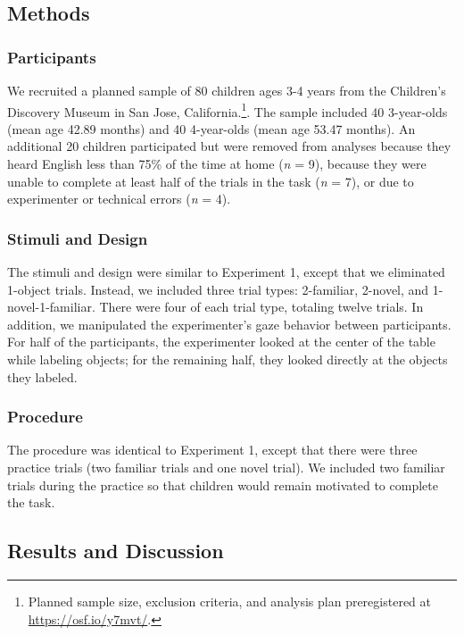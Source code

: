 \documentclass[10pt, letterpaper]{article}
\begin{document}
\subsection{Methods}\label{methods-1}

\subsubsection{Participants}\label{participants-1}

We recruited a planned sample of 80 children ages 3-4 years from the
Children's Discovery Museum in San Jose, California.\footnote{Planned
  sample size, exclusion criteria, and analysis plan preregistered at
  \url{https://osf.io/y7mvt/}.}. The sample included 40 3-year-olds
(mean age 42.89 months) and 40 4-year-olds (mean age 53.47 months). An
additional 20 children participated but were removed from analyses
because they heard English less than 75\% of the time at home (\emph{n}
= 9), because they were unable to complete at least half of the trials
in the task (\emph{n} = 7), or due to experimenter or technical errors
(\emph{n} = 4).

\subsubsection{Stimuli and Design}\label{stimuli-and-design-1}

The stimuli and design were similar to Experiment 1, except that we
eliminated 1-object trials. Instead, we included three trial types:
2-familiar, 2-novel, and 1-novel-1-familiar. There were four of each
trial type, totaling twelve trials. In addition, we manipulated the
experimenter's gaze behavior between participants. For half of the
participants, the experimenter looked at the center of the table while
labeling objects; for the remaining half, they looked directly at the
objects they labeled.

\subsubsection{Procedure}\label{procedure-1}

The procedure was identical to Experiment 1, except that there were
three practice trials (two familiar trials and one novel trial). We
included two familiar trials during the practice so that children would
remain motivated to complete the task.

\subsection{Results and Discussion}\label{results-and-discussion-1}
\end{document}

